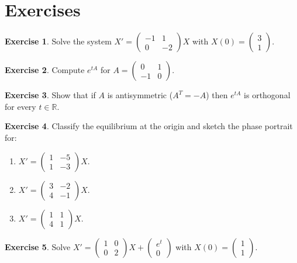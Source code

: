 \documentclass[12pt,a4paper,openany]{book}
\theoremstyle{definition}
\newtheorem{exercise}{Exercise}[chapter]
\theoremstyle{plain}
\theoremstyle{remark}
\newcommand{\R}{\mathbb{R}}
\begin{document}
\section{Exercises}\label{sec:sys-exercises}

\begin{exercise}\label{exo:sys-1}
Solve the system $X'=\begin{pmatrix}-1&1\\0&-2\end{pmatrix}X$
with $X(0)=\begin{pmatrix}3\\1\end{pmatrix}$.
\end{exercise}

\begin{exercise}\label{exo:sys-2}
Compute $e^{tA}$ for $A=\begin{pmatrix}0&1\\-1&0\end{pmatrix}$.
\end{exercise}

\begin{exercise}\label{exo:sys-3}
Show that if $A$ is antisymmetric ($A^T=-A$) then $e^{tA}$ is orthogonal
for every $t\in\R$.
\end{exercise}

\begin{exercise}\label{exo:sys-4}
Classify the equilibrium at the origin and sketch the phase portrait for:
\begin{enumerate}[label=(\alph*)]
  \item $X'=\begin{pmatrix}1&-5\\1&-3\end{pmatrix}X$.
  \item $X'=\begin{pmatrix}3&-2\\4&-1\end{pmatrix}X$.
  \item $X'=\begin{pmatrix}1&1\\4&1\end{pmatrix}X$.
\end{enumerate}
\end{exercise}

\begin{exercise}\label{exo:sys-5}
Solve $X'=\begin{pmatrix}1&0\\0&2\end{pmatrix}X
+\begin{pmatrix}e^t\\0\end{pmatrix}$ with $X(0)=\begin{pmatrix}1\\1\end{pmatrix}$.
\end{exercise}
\end{document}
